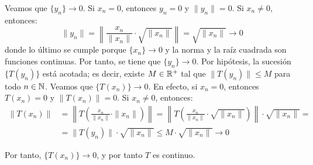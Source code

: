 \begin{ejercicio}
\begin{description}
    Veamos que $\{y_n\} \to 0$. Si $x_n = 0$, entonces $y_n = 0$ y $\|y_n\| = 0$. Si $x_n \neq 0$, entonces:
    \begin{equation*}
        \|y_n\| = \left\|\frac{x_n}{\|x_n\|} \cdot \sqrt{\|x_n\|}\right\| = \sqrt{\|x_n\|} \to 0
    \end{equation*}
    donde lo último se cumple porque $\{x_n\} \to 0$ y la norma y la raíz cuadrada son funciones continuas.
    Por tanto, se tiene que $\{y_n\} \to 0$. Por hipótesis, la sucesión $\{T(y_n)\}$ está acotada; es decir, existe $M \in \mathbb{R}^+$ tal que $\|T(y_n)\| \leq M$ para todo $n \in \mathbb{N}$. Veamos que $\{T(x_n)\} \to 0$. En efecto, si $x_n = 0$, entonces $T(x_n) = 0$ y $\|T(x_n)\| = 0$. Si $x_n \neq 0$, entonces:
    \begin{align*}
        \|T(x_n)\| &= \left\|T\left(\frac{x_n}{\|x_n\|} \cdot \|x_n\|\right)\right\| = \left\|T\left(\frac{x_n}{\|x_n\|} \cdot \sqrt{\|x_n\|}\right)\right\| \cdot \sqrt{\|x_n\|} =\\&= \|T(y_n)\| \cdot \sqrt{\|x_n\|} \leq M \cdot \sqrt{\|x_n\|}\to 0
    \end{align*}

    Por tanto, $\{T(x_n)\} \to 0$, y por tanto $T$ es continuo.
\end{description}
\end{ejercicio}


